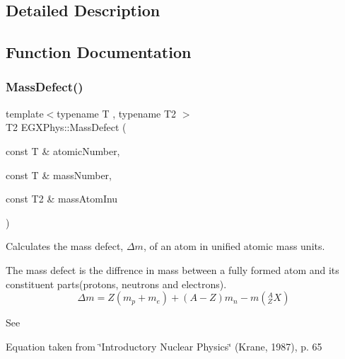 \subsection{Detailed Description}


\subsection{Function Documentation}
\mbox{\label{group___e_g_x_phys_gae89f2dfa65992c0314adc2440b2f582a}} 
\subsubsection{\texorpdfstring{Mass\+Defect()}{MassDefect()}}
{\footnotesize\ttfamily template$<$typename T , typename T2 $>$ \\
T2 E\+G\+X\+Phys\+::\+Mass\+Defect (\begin{DoxyParamCaption}\item[{const T \&}]{atomic\+Number,  }\item[{const T \&}]{mass\+Number,  }\item[{const T2 \&}]{mass\+Atom\+Inu }\end{DoxyParamCaption})}



Calculates the mass defect, $\Delta m$, of an atom in unified atomic mass units. 

The mass defect is the diffrence in mass between a fully formed atom and its constituent parts(protons, neutrons and electrons). \[\Delta m = Z(m_p + m_e)+(A-Z)m_n - m({^A_ZX})\]

See

Equation taken from \char`\"{}\+Introductory Nuclear Physics\char`\"{} (Krane, 1987), p. 65


